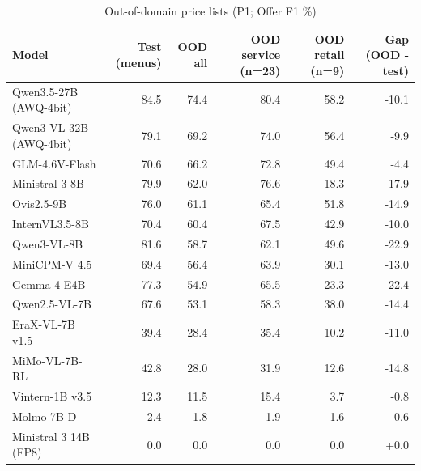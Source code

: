 \begin{table}[t]
\centering
\caption{Out-of-domain price lists (P1; Offer F1 \%)}
\label{tab:ood}
\small
\begin{tabular}{lrrrrr}
\toprule
Model & Test (menus) & OOD all & OOD service (n=23) & OOD retail (n=9) & Gap (OOD - test) \\
\midrule
Qwen3.5-27B (AWQ-4bit) & 84.5 & 74.4 & 80.4 & 58.2 & -10.1 \\
Qwen3-VL-32B (AWQ-4bit) & 79.1 & 69.2 & 74.0 & 56.4 & -9.9 \\
GLM-4.6V-Flash & 70.6 & 66.2 & 72.8 & 49.4 & -4.4 \\
Ministral 3 8B & 79.9 & 62.0 & 76.6 & 18.3 & -17.9 \\
Ovis2.5-9B & 76.0 & 61.1 & 65.4 & 51.8 & -14.9 \\
InternVL3.5-8B & 70.4 & 60.4 & 67.5 & 42.9 & -10.0 \\
Qwen3-VL-8B & 81.6 & 58.7 & 62.1 & 49.6 & -22.9 \\
MiniCPM-V 4.5 & 69.4 & 56.4 & 63.9 & 30.1 & -13.0 \\
Gemma 4 E4B & 77.3 & 54.9 & 65.5 & 23.3 & -22.4 \\
Qwen2.5-VL-7B & 67.6 & 53.1 & 58.3 & 38.0 & -14.4 \\
EraX-VL-7B v1.5 & 39.4 & 28.4 & 35.4 & 10.2 & -11.0 \\
MiMo-VL-7B-RL & 42.8 & 28.0 & 31.9 & 12.6 & -14.8 \\
Vintern-1B v3.5 & 12.3 & 11.5 & 15.4 & 3.7 & -0.8 \\
Molmo-7B-D & 2.4 & 1.8 & 1.9 & 1.6 & -0.6 \\
Ministral 3 14B (FP8) & 0.0 & 0.0 & 0.0 & 0.0 & +0.0 \\
\bottomrule
\end{tabular}
\par{}
\end{table}
